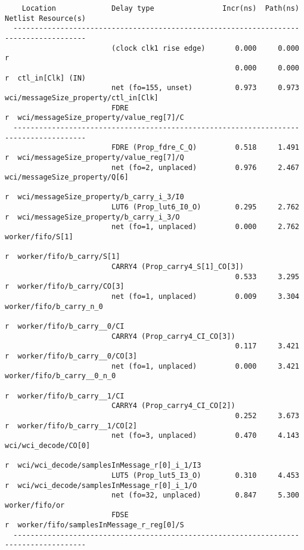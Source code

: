 \documentclass{article}
\begin{document}
\begin{lstlisting}
    Location             Delay type                Incr(ns)  Path(ns)    Netlist Resource(s)
  -------------------------------------------------------------------    -------------------
                         (clock clk1 rise edge)       0.000     0.000 r  
                                                      0.000     0.000 r  ctl_in[Clk] (IN)
                         net (fo=155, unset)          0.973     0.973    wci/messageSize_property/ctl_in[Clk]
                         FDRE                                         r  wci/messageSize_property/value_reg[7]/C
  -------------------------------------------------------------------    -------------------
                         FDRE (Prop_fdre_C_Q)         0.518     1.491 r  wci/messageSize_property/value_reg[7]/Q
                         net (fo=2, unplaced)         0.976     2.467    wci/messageSize_property/Q[6]
                                                                      r  wci/messageSize_property/b_carry_i_3/I0
                         LUT6 (Prop_lut6_I0_O)        0.295     2.762 r  wci/messageSize_property/b_carry_i_3/O
                         net (fo=1, unplaced)         0.000     2.762    worker/fifo/S[1]
                                                                      r  worker/fifo/b_carry/S[1]
                         CARRY4 (Prop_carry4_S[1]_CO[3])
                                                      0.533     3.295 r  worker/fifo/b_carry/CO[3]
                         net (fo=1, unplaced)         0.009     3.304    worker/fifo/b_carry_n_0
                                                                      r  worker/fifo/b_carry__0/CI
                         CARRY4 (Prop_carry4_CI_CO[3])
                                                      0.117     3.421 r  worker/fifo/b_carry__0/CO[3]
                         net (fo=1, unplaced)         0.000     3.421    worker/fifo/b_carry__0_n_0
                                                                      r  worker/fifo/b_carry__1/CI
                         CARRY4 (Prop_carry4_CI_CO[2])
                                                      0.252     3.673 r  worker/fifo/b_carry__1/CO[2]
                         net (fo=3, unplaced)         0.470     4.143    wci/wci_decode/CO[0]
                                                                      r  wci/wci_decode/samplesInMessage_r[0]_i_1/I3
                         LUT5 (Prop_lut5_I3_O)        0.310     4.453 r  wci/wci_decode/samplesInMessage_r[0]_i_1/O
                         net (fo=32, unplaced)        0.847     5.300    worker/fifo/or
                         FDSE                                         r  worker/fifo/samplesInMessage_r_reg[0]/S
  -------------------------------------------------------------------    -------------------


\end{lstlisting}
\end{document}

